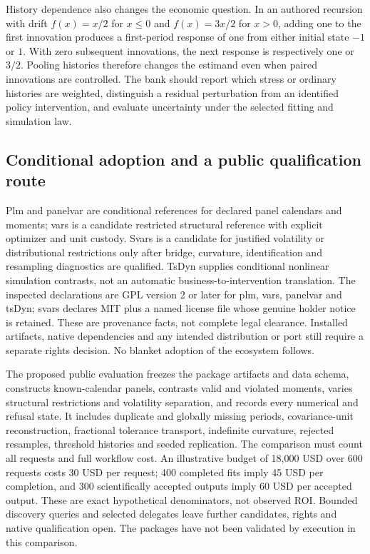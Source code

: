 History dependence also changes the economic question. In an authored recursion with drift $f(x)=x/2$ for $x\leq0$ and $f(x)=3x/2$ for $x>0$, adding one to the first innovation produces a first-period response of one from either initial state $-1$ or $1$. With zero subsequent innovations, the next response is respectively one or $3/2$. Pooling histories therefore changes the estimand even when paired innovations are controlled. The bank should report which stress or ordinary histories are weighted, distinguish a residual perturbation from an identified policy intervention, and evaluate uncertainty under the selected fitting and simulation law.~\citep{exec25_rdyn_choice}

\subsection{Conditional adoption and a public qualification route}

Plm and panelvar are conditional references for declared panel calendars and moments; vars is a candidate restricted structural reference with explicit optimizer and unit custody. Svars is a candidate for justified volatility or distributional restrictions only after bridge, curvature, identification and resampling diagnostics are qualified. TsDyn supplies conditional nonlinear simulation contrasts, not an automatic business-to-intervention translation. The inspected declarations are GPL version 2 or later for plm, vars, panelvar and tsDyn; svars declares MIT plus a named license file whose genuine holder notice is retained. These are provenance facts, not complete legal clearance. Installed artifacts, native dependencies and any intended distribution or port still require a separate rights decision. No blanket adoption of the ecosystem follows.~\citep{exec25_rdyn_plm,exec25_rdyn_vars,exec25_rdyn_svars,exec25_rdyn_panelvar,exec25_rdyn_tsdyn}

The proposed public evaluation freezes the package artifacts and data schema, constructs known-calendar panels, contrasts valid and violated moments, varies structural restrictions and volatility separation, and records every numerical and refusal state. It includes duplicate and globally missing periods, covariance-unit reconstruction, fractional tolerance transport, indefinite curvature, rejected resamples, threshold histories and seeded replication. The comparison must count all requests and full workflow cost. An illustrative budget of 18,000 USD over 600 requests costs 30 USD per request; 400 completed fits imply 45 USD per completion, and 300 scientifically accepted outputs imply 60 USD per accepted output. These are exact hypothetical denominators, not observed ROI. Bounded discovery queries and selected delegates leave further candidates, rights and native qualification open. The packages have not been validated by execution in this comparison.~\citep{exec25_rdyn_choice}


